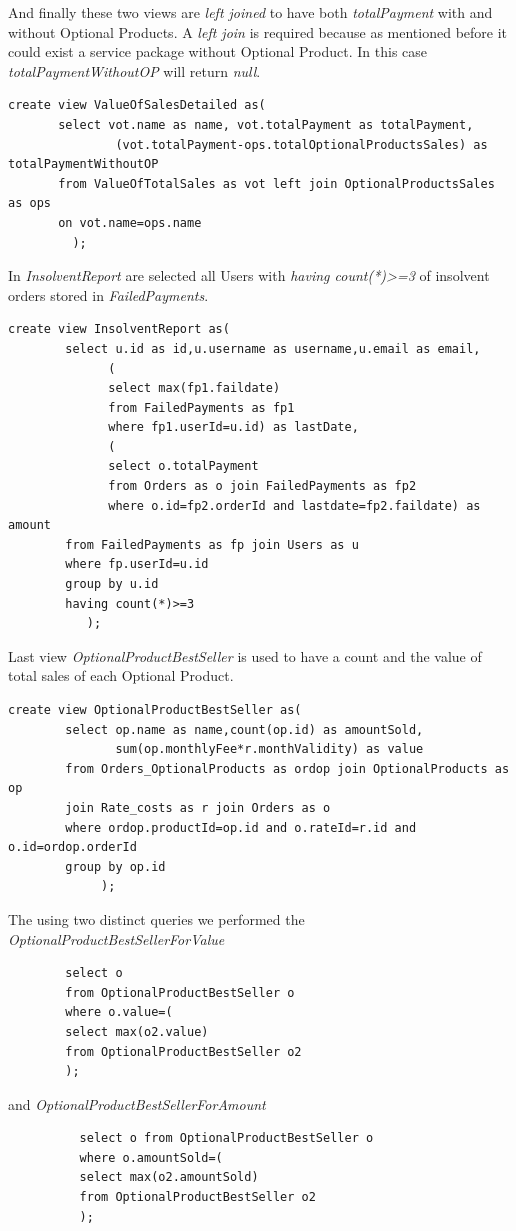\documentclass{article}
\begin{document}
And finally these two views are \emph{left joined} to have both \emph{totalPayment} with and without Optional Products. A \emph{left join} is required because as mentioned before it could exist a service package without Optional Product. In this case \emph{totalPaymentWithoutOP} will return \emph{null}.
\begin{lstlisting}
create view ValueOfSalesDetailed as(
       select vot.name as name, vot.totalPayment as totalPayment, 
               (vot.totalPayment-ops.totalOptionalProductsSales) as totalPaymentWithoutOP
       from ValueOfTotalSales as vot left join OptionalProductsSales as ops
       on vot.name=ops.name
         );
\end{lstlisting}                                     


In \emph{InsolventReport} are selected all Users with \emph{having count(*)>=3} of insolvent orders stored in \emph{FailedPayments}.
\begin{lstlisting}
create view InsolventReport as(
        select u.id as id,u.username as username,u.email as email,
              (
              select max(fp1.faildate) 
              from FailedPayments as fp1  
              where fp1.userId=u.id) as lastDate,
              (
              select o.totalPayment 
              from Orders as o join FailedPayments as fp2 
              where o.id=fp2.orderId and lastdate=fp2.faildate) as amount
        from FailedPayments as fp join Users as u
        where fp.userId=u.id
        group by u.id
        having count(*)>=3
           );
\end{lstlisting}

Last view  \emph{OptionalProductBestSeller} is used to have a count and the value of total sales of each Optional Product.
\begin{lstlisting}
create view OptionalProductBestSeller as(
        select op.name as name,count(op.id) as amountSold, 
               sum(op.monthlyFee*r.monthValidity) as value
        from Orders_OptionalProducts as ordop join OptionalProducts as op 
        join Rate_costs as r join Orders as o
        where ordop.productId=op.id and o.rateId=r.id and o.id=ordop.orderId
        group by op.id
             );
\end{lstlisting}
The using two distinct queries we performed the  \emph{OptionalProductBestSellerForValue}
\begin{lstlisting}
        select o 
        from OptionalProductBestSeller o 
        where o.value=(
        select max(o2.value) 
        from OptionalProductBestSeller o2
        );
\end{lstlisting}
and  \emph{OptionalProductBestSellerForAmount}
\begin{lstlisting}
          select o from OptionalProductBestSeller o 
          where o.amountSold=(
          select max(o2.amountSold) 
          from OptionalProductBestSeller o2
          );
\end{lstlisting}
\newpage
\end{document}
